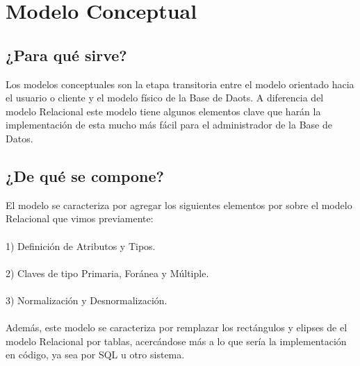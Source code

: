 \documentclass[12pt]{article}
\begin{document}
\section*{Modelo Conceptual}

\subsection*{¿Para qué sirve?}
Los modelos conceptuales son la etapa transitoria entre el modelo orientado hacia el
usuario o cliente y el modelo físico de la Base de Daots. A diferencia del modelo 
Relacional este modelo tiene algunos elementos clave que harán la implementación de 
esta mucho más fácil para el administrador de la Base de Datos.

\subsection*{¿De qué se compone?}
El modelo se caracteriza por agregar los siguientes elementos por sobre el modelo
Relacional que vimos previamente:
\\\\
1) Definición de Atributos y Tipos.
\\\\
2) Claves de tipo Primaria, Foránea y Múltiple.
\\\\
3) Normalización y Desnormalización.
\\\\
Además, este modelo se caracteriza por remplazar los rectángulos y elipses de el 
modelo Relacional por tablas, acercándose más a lo que sería la implementación en 
código, ya sea por SQL u otro sistema.

\newpage
\end{document}
